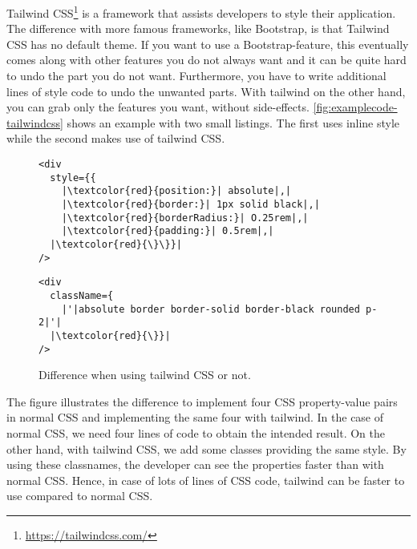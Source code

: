 Tailwind CSS\footnote{\url{https://tailwindcss.com/}} is a framework that assists developers to style their application. The difference with more famous frameworks, like Bootstrap, is that Tailwind CSS has no default theme. If you want to use a Bootstrap-feature, this eventually comes along with other features you do not always want and it can be quite hard to undo the part you do not want. Furthermore, you have to write additional lines of style code to undo the unwanted parts. With tailwind on the other hand, you can grab only the features you want, without side-effects. \autoref{fig:examplecode-tailwindcss} shows an example with two small listings. The first uses inline style while the second makes use of tailwind CSS.

\begin{figure}[H]
	\begin{minipage}[b]{0.5\textwidth}
 		\centering
  		\begin{verbatim}
<div
  style={{
    |\textcolor{red}{position:}| absolute|,|
    |\textcolor{red}{border:}| 1px solid black|,|
    |\textcolor{red}{borderRadius:}| O.25rem|,|
    |\textcolor{red}{padding:}| 0.5rem|,|
  |\textcolor{red}{\}\}}|
/>
		\end{verbatim}
		\label{lst:no-tailwind}
	\end{minipage}
 	\begin{minipage}[b]{0.5\textwidth}
  		\centering
		\begin{verbatim}
<div
  className={
    |'|absolute border border-solid border-black rounded p-2|'|
  |\textcolor{red}{\}}|
/>
		\end{verbatim}
		\label{lst:tailwind}
 	\end{minipage}
	\caption{Difference when using tailwind CSS or not.}
	\label{fig:examplecode-tailwindcss}
\end{figure}

The figure illustrates the difference to implement four CSS property-value pairs in normal CSS and implementing the same four with tailwind. In the case of normal CSS, we need four lines of code to obtain the intended result. On the other hand, with tailwind CSS, we add some classes providing the same style. By using these classnames, the developer can see the properties faster than with normal CSS. Hence, in case of lots of lines of CSS code, tailwind can be faster to use compared to normal CSS.\\

